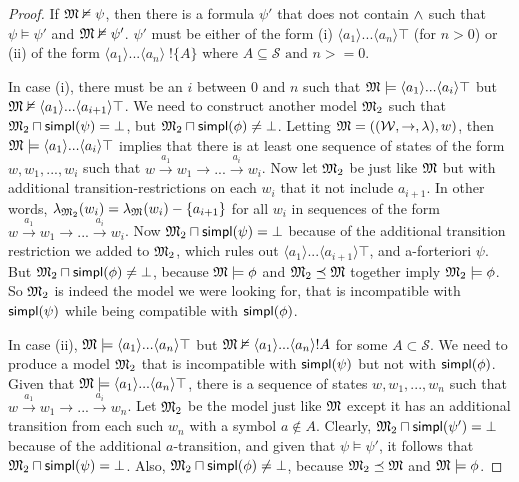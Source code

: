 \begin{proof}
If $\frak{M} \nvDash \psi$, then there is a formula $\psi'$ that does not contain
$\land$ such that $\psi \models \psi'$ and $\frak{M} \nvDash \psi'$. $\psi'$ must be
either of the form (i) $\langle a_1 \rangle ... \langle a_n \rangle
\top$ (for $n > 0$) or (ii) of the form $\langle a_1 \rangle
... \langle a_n \rangle \; !\{A\}$ where $A \subseteq \mathcal{S}
\mbox{ and } n >= 0$.

In case (i), there must be an $i$ between $0$ and $n$ such that $\frak{M}
\models \langle a_1 \rangle ... \langle a_i \rangle \top$ but $\frak{M}
\nvDash \langle a_1 \rangle ... \langle a_{i+1} \rangle \top$. We need
to construct another model $\frak{M}_2$ such that $\frak{M}_2 \sqcap \mathsf{simpl}(\psi) = \bot$,
but $\frak{M}_2 \sqcap \mathsf{simpl}(\phi) \neq \bot$. Letting $\frak{M} =
((\mathcal{W},\rightarrow,\lambda),w)$, then $\frak{M} \models \langle a_1
\rangle ... \langle a_i \rangle \top$ implies that there is at least
one sequence of states of the form $w, w_1, ..., w_i$ such that $w
\xrightarrow{a_1} w_1 \rightarrow ... \xrightarrow{a_i} w_i$.  Now let
$\frak{M}_2$ be just like $\frak{M}$ but with additional transition-restrictions on
each $w_i$ that it not include $a_{i+1}$.  In other words,
$\lambda_{\frak{M}_2}(w_i) = \lambda_\frak{M}(w_i) - \{a_{i+1}\}$ for all $w_i$ in
sequences of the form $w \xrightarrow{a_1} w_1 \rightarrow
... \xrightarrow{a_i} w_i$. Now $\frak{M}_2 \sqcap \mathsf{simpl}(\psi) = \bot$ because of
the additional transition restriction we added to $\frak{M}_2$, which rules out
$\langle a_1 \rangle ... \langle a_{i+1} \rangle \top$, and
a-forteriori $\psi$. But $\frak{M}_2 \sqcap \mathsf{simpl}(\phi) \neq \bot$, because $\frak{M}
\models \phi$ and $\frak{M}_2 \preceq \frak{M}$ together imply $\frak{M}_2 \models \phi$. So $\frak{M}_2$ is
indeed the model we were looking for, that is incompatible with
$\mathsf{simpl}(\psi)$ while being compatible with $\mathsf{simpl}(\phi)$.

In case (ii), $\frak{M} \models \langle a_1 \rangle ... \langle a_n \rangle
\top$ but $\frak{M} \nvDash \langle a_1 \rangle ... \langle a_n \rangle !A$
for some $A \subset \mathcal{S}$. We need to produce a model $\frak{M}_2$ that
is incompatible with $\mathsf{simpl}(\psi)$ but not with $\mathsf{simpl}(\phi)$. Given that
$\frak{M} \models \langle a_1 \rangle ... \langle a_n \rangle \top$, there is
a sequence of states $w, w_1, ..., w_n$ such that $w \xrightarrow{a_1}
w_1 \rightarrow ... \xrightarrow{a_i} w_n$. Let $\frak{M}_2$ be the model just
like $\frak{M}$ except it has an additional transition from each such $w_n$
with a symbol $a \notin A$. 
Clearly, $\frak{M}_2 \sqcap \mathsf{simpl}(\psi') = \bot$
because of the additional $a$-transition, and given that $\psi \models
\psi'$, it follows that $\frak{M}_2 \sqcap \mathsf{simpl}(\psi) = \bot$. Also, $\frak{M}_2 \sqcap
\mathsf{simpl}(\phi) \neq \bot$, because $\frak{M}_2 \preceq \frak{M}$ and $\frak{M} \models \phi$.


\end{proof}

